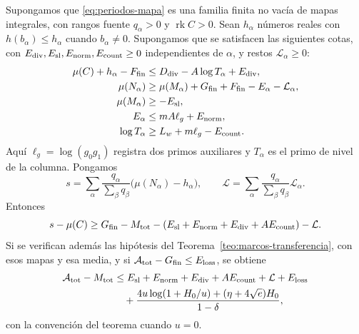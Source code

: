 \begin{proposicion}
Supongamos que \eqref{eq:periodos-mapa} es una familia finita no vacía
de mapas integrales, con rangos fuente $q_\alpha>0$ y
$\operatorname{rk}C>0$. Sean $h_\alpha$ números reales con
$h(b_\alpha)\le h_\alpha$ cuando $b_\alpha\ne0$.
Supongamos que se satisfacen las siguientes cotas, con
$E_{\rm div},E_{\rm sl},E_{\rm norm},E_{\rm count}\ge0$
independientes de $\alpha$, y restos $\mathcal L_\alpha\ge0$:
\begin{align}
 \mu(C)+h_\alpha-F_{\rm fin}
   &\le D_{\rm div}-A\log T_\alpha+E_{\rm div},
       \label{eq:periodos-balance-norma}\\
 \mu(N_\alpha)
   &\ge\mu(M_\alpha)+G_{\rm fin}+F_{\rm fin}
                                      -E_\alpha-\mathcal L_\alpha,
       \label{eq:periodos-balance-finito}\\
 \mu(M_\alpha)&\ge-E_{\rm sl},
       \label{eq:periodos-balance-base}\\
 E_\alpha&\le mA\ell_g+E_{\rm norm},
       \label{eq:periodos-balance-normalizacion}\\
 \log T_\alpha&\ge L_w+m\ell_g-E_{\rm count}.
       \label{eq:periodos-balance-conteo}
\end{align}
Aquí $\ell_g=\log(g_0g_1)$ registra dos primos auxiliares y
$T_\alpha$ es el primo de nivel de la columna. Pongamos
\[
 s=\sum_\alpha\frac{q_\alpha}{\sum_\beta q_\beta}
                    \bigl(\mu(N_\alpha)-h_\alpha\bigr),
 \qquad
 \mathcal L=\sum_\alpha\frac{q_\alpha}{\sum_\beta q_\beta}
                    \mathcal L_\alpha.
\]
Entonces
\begin{equation}
 s-\mu(C)\ge G_{\rm fin}-M_{\rm tot}
       -(E_{\rm sl}+E_{\rm norm}+E_{\rm div}
                      +AE_{\rm count})-\mathcal L.
 \label{eq:periodos-balance-media}
\end{equation}
Si se verifican además las hipótesis del
Teorema~\ref{teo:marcos-transferencia}, con esos mapas y esa media,
y si $\mathcal A_{\rm tot}-G_{\rm fin}\le E_{\rm loss}$, se obtiene
\begin{align}
 \mathcal A_{\rm tot}-M_{\rm tot}
 &\le E_{\rm sl}+E_{\rm norm}+E_{\rm div}
                +AE_{\rm count}+\mathcal L+E_{\rm loss}
                \notag\\
 &\quad+\frac{4u\log(1+H_0/u)+(\eta+4\sqrt e)H_0}{1-\delta},
 \label{eq:periodos-exceso}
\end{align}
con la convención del teorema cuando $u=0$.
\label{prop:periodos-balance}
\end{proposicion}

